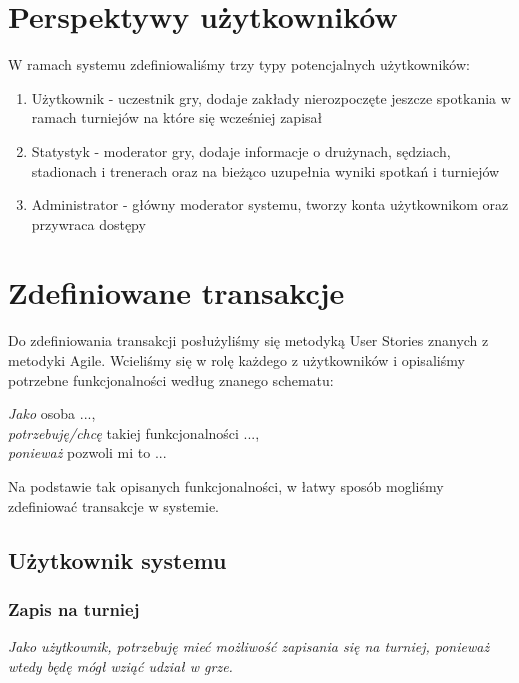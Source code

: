 \documentclass{mwrep}[15pt]
\begin{document}
\section{Perspektywy użytkowników}
W ramach systemu zdefiniowaliśmy trzy typy potencjalnych użytkowników: \\
\begin{enumerate}
    \item Użytkownik - uczestnik gry, dodaje zakłady nierozpoczęte jeszcze spotkania w
    ramach turniejów na które się wcześniej zapisał\\ 

    \item Statystyk - moderator gry, dodaje informacje o drużynach, sędziach, stadionach i trenerach
    oraz na bieżąco uzupełnia wyniki spotkań i turniejów \\ 

    \item Administrator - główny moderator systemu, tworzy konta użytkownikom oraz przywraca dostępy \\
    
\end{enumerate}

\section{Zdefiniowane transakcje}
Do zdefiniowania transakcji posłużyliśmy się metodyką User Stories znanych z metodyki Agile. Wcieliśmy się 
w rolę każdego z użytkowników i opisaliśmy potrzebne funkcjonalności według znanego schematu:

\begin{center}
    \emph{Jako} osoba ..., \\ \emph{potrzebuję/chcę} takiej funkcjonalności ...,\\  \emph{ponieważ} pozwoli mi to ...  
\end{center}

Na podstawie tak opisanych funkcjonalności, w łatwy sposób mogliśmy zdefiniować transakcje w systemie.

\subsection{Użytkownik systemu}

\subsubsection{Zapis na turniej}
\emph{Jako użytkownik, potrzebuję mieć możliwość zapisania się na turniej, ponieważ wtedy będę mógł wziąć udział w grze.}
\end{document}

